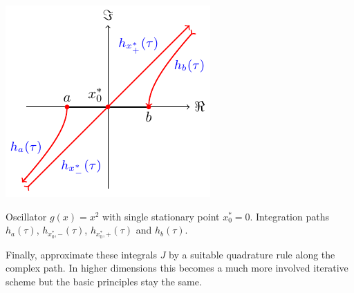 \documentclass[b0paper,portrait,fontscale=0.24]{baposter}
\begin{document}
\begin{poster}
{\begin{minipage}[t]{\linewidth}
\begin{minipage}[t]{0.29\linewidth}
        \begin{center}
          \includegraphics[width=\textwidth,height=\textwidth]{nsd_path_figure.pdf}
        \end{center}
        \vspace{-0.4cm}
        Oscillator $g(x)=x^{2}$ with single stationary point $x^{*}_{0}=0$.
        Integration paths $h_{a}(\tau)$, $h_{x^{*}_{0},-}(\tau)$,
        $h_{x^{*}_{0},+}(\tau)$ and $h_{b}(\tau)$.
      \end{minipage}
    \end{minipage}
    Finally, approximate these integrals $J$ by a suitable quadrature rule
    along the complex path. In higher dimensions this becomes a much more
    involved iterative scheme but the basic principles stay the same.
  }



\end{poster}
\end{document}
